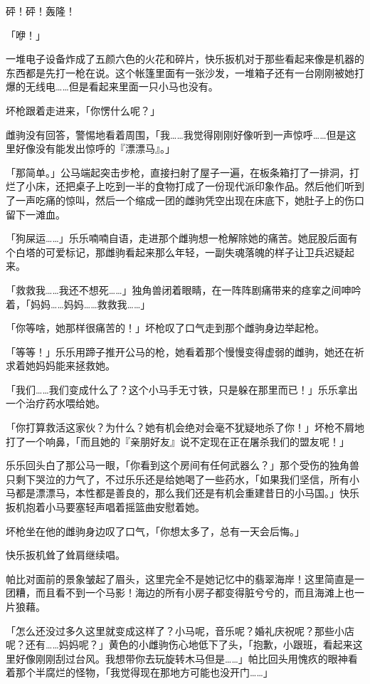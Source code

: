 砰！砰！轰隆！

「咿！」

一堆电子设备炸成了五颜六色的火花和碎片，快乐扳机对于那些看起来像是机器的东西都是先打一枪在说。这个帐篷里面有一张沙发，一堆箱子还有一台刚刚被她打爆的无线电……但是看起来里面一只小马也没有。

坏枪跟着走进来，「你愣什么呢？」

雌驹没有回答，警惕地看着周围，「我……我觉得刚刚好像听到一声惊呼……但是这里好像没有能发出惊呼的『漂漂马』。」

「那简单。」公马端起突击步枪，直接扫射了屋子一遍，在板条箱打了一排洞，打烂了小床，还把桌子上吃到一半的食物打成了一份现代派印象作品。然后他们听到了一声吃痛的惊叫，然后一个缩成一团的雌驹凭空出现在床底下，她肚子上的伤口留下一滩血。

「狗屎运……」乐乐喃喃自语，走进那个雌驹想一枪解除她的痛苦。她屁股后面有个白塔的可爱标记，那雌驹看起来那么年轻，一副失魂落魄的样子让卫兵迟疑起来。

「救救我……我还不想死……」独角兽闭着眼睛，在一阵阵剧痛带来的痉挛之间呻吟着，「妈妈……妈妈……救救我……」

「你等啥，她那样很痛苦的！」坏枪叹了口气走到那个雌驹身边举起枪。

「等等！」乐乐用蹄子推开公马的枪，她看着那个慢慢变得虚弱的雌驹，她还在祈求着她妈妈能来拯救她。

「我们……我们变成什么了？这个小马手无寸铁，只是躲在那里而已！」乐乐拿出一个治疗药水喂给她。

「你打算救活这家伙？为什么？她有机会绝对会毫不犹疑地杀了你！」坏枪不屑地打了一个响鼻，「而且她的『亲朋好友』说不定现在正在屠杀我们的盟友呢！」

乐乐回头白了那公马一眼，「你看到这个房间有任何武器么？」那个受伤的独角兽只剩下哭泣的力气了，不过乐乐还是给她喝了一些药水，「如果我们坚信，所有小马都是漂漂马，本性都是善良的，那么我们还是有机会重建昔日的小马国。」快乐扳机抱着小马要塞轻声唱着摇篮曲安慰着她。

坏枪坐在他的雌驹身边叹了口气，「你想太多了，总有一天会后悔。」

快乐扳机耸了耸肩继续唱。

\horizonline


帕比对面前的景象皱起了眉头，这里完全不是她记忆中的翡翠海岸！这里简直是一团糟，而且看不到一个马影！海边的所有小房子都变得脏兮兮的，而且海滩上也一片狼藉。

「怎么还没过多久这里就变成这样了？小马呢，音乐呢？婚礼庆祝呢？那些小店呢？还有……妈妈呢？」黄色的小雌驹伤心地低下了头，「抱歉，小跟班，看起来这里好像刚刚刮过台风。我想带你去玩旋转木马但是……」帕比回头用愧疚的眼神看着那个半腐烂的怪物，「我觉得现在那地方可能也没开门……」


